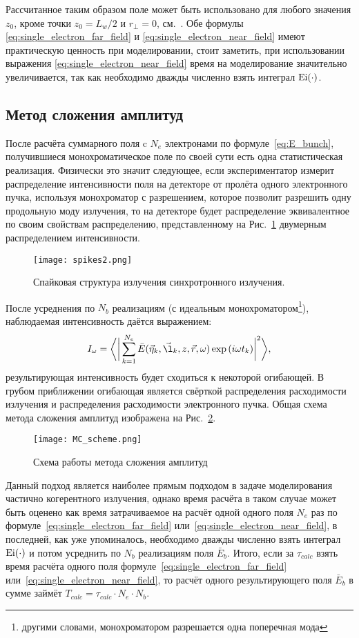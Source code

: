 Рассчитанное таким образом поле может быть использовано для любого значения $z_0$, кроме точки $z_0 = L_w/2$ и $r_{\bot} = 0$, см.~\cite{geloni_fourier_2007}. Обе формулы \ref{eq:single_electron_far_field} и \ref{eq:single_electron_near_field} имеют практическую ценность при моделировании, стоит заметить, при использовании выражения \ref{eq:single_electron_near_field} время на моделирование значительно увеличивается, так как необходимо дважды численно взять интеграл $\textup{Ei}(\cdot)$.
 
\subsection{Метод сложения амплитуд}
После расчёта суммарного поля c $N_e$ электронами по формуле~\ref{eq:E_bunch}, получившиеся монохроматическое поле по своей сути есть одна статистическая реализация. Физически это значит следующее, если экспериментатор измерит распределение интенсивности поля на детекторе от пролёта одного электронного пучка, используя монохроматор с разрешением, которое позволит разрешить одну продольную моду излучения, то на детекторе будет распределение эквивалентное по своим свойствам распределению, представленному на Рис.~\ref{fig:spikes2} двумерным распределением интенсивности. 
\begin{figure}[H]
	\centering 	\texttt{[image: spikes2.png]}
	\caption{Спайковая структура излучения синхротронного излучения.}
	\label{fig:spikes2}
\end{figure}
После усреднения по $N_b$ реализациям (с идеальным монохроматором\footnote{другими словами, монохроматором разрешается одна поперечная мода}), наблюдаемая интенсивность даётся выражением: 
\begin{align}
	I_{\omega} = \bigg \langle \bigg|\sum\limits_{k=1}^{N_e} \bar{E}(\vec{\eta}_k, \vec{\l}_k, z, \vec{r}, \omega) \exp{(i \omega t_k)}\bigg|^2 \bigg \rangle,
	\label{eq:I_MC} 
\end{align}
\noindent результирующая интенсивность будет сходиться к некоторой огибающей. В грубом приближении огибающая является свёрткой распределения расходимости излучения и распределения расходимости электронного пучка. Общая схема метода сложения амплитуд изображена на Рис.~\ref{fig:MC_scheme}. 
\begin{figure}[H] 
	\centering 	\texttt{[image: MC\_scheme.png]}
	\caption{Схема работы метода сложения амплитуд}
	\label{fig:MC_scheme}
\end{figure}
Данный подход является наиболее прямым подходом в задаче моделирования частично когерентного излучения, однако время расчёта в таком случае может быть оценено как время затрачиваемое на расчёт одной одного поля $N_e$ раз по формуле~\ref{eq:single_electron_far_field} или~\ref{eq:single_electron_near_field}, в последней, как уже упоминалось, необходимо дважды численно взять интеграл $\textup{Ei}(\cdot)$ и потом усреднить по $N_b$ реализациям поля $\bar{E}_{b}$. Итого, если за $\tau_{calc}$ взять время расчёта одного поля формуле~\ref{eq:single_electron_far_field} или~\ref{eq:single_electron_near_field}, то расчёт одного результирующего поля $\bar{E}_{b}$ в сумме займёт $T_{calc} = \tau_{calc} \cdot N_e \cdot N_b$.


